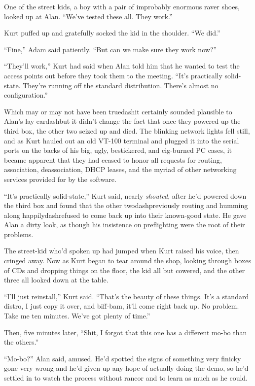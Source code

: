 One of the street kids, a boy with a pair of improbably enormous raver
shoes, looked up at Alan.  ``We've tested these all.  They work.''

Kurt puffed up and gratefully socked the kid in the shoulder.  ``We
did.''

``Fine,'' Adam said patiently.  ``But can we make sure they work
now?''

``They'll work,'' Kurt had said when Alan told him that he wanted to
test the access points out before they took them to the meeting. 
``It's practically solid-state.  They're running off the standard
distribution.  There's almost no configuration.''

Which may or may not have been truedash{}it certainly sounded plausible
to Alan's lay eardash{}but it didn't change the fact that once they
powered up the third box, the other two seized up and died.  The
blinking network lights fell still, and as Kurt hauled out an old
VT-100 terminal and plugged it into the serial ports on the backs of
his big, ugly, bestickered, and cig-burned PC cases, it became
apparent that they had ceased to honor all requests for routing,
association, deassociation, DHCP leases, and the myriad of other
networking services provided for by the software.

``It's practically solid-state,'' Kurt said, nearly \textit{shouted},
after he'd powered down the third box and found that the other
twodash{}previously routing and humming along happilydash{}refused to come
back up into their known-good state.  He gave Alan a dirty look, as
though his insistence on preflighting were the root of their problems.

The street-kid who'd spoken up had jumped when Kurt raised his voice,
then cringed away.  Now as Kurt began to tear around the shop, looking
through boxes of CDs and dropping things on the floor, the kid all but
cowered, and the other three all looked down at the table.

``I'll just reinstall,'' Kurt said.  ``That's the beauty of these
things.  It's a standard distro, I just copy it over, and biff-bam,
it'll come right back up.  No problem.  Take me ten minutes.  We've
got plenty of time.''

Then, five minutes later, ``Shit, I forgot that this one has a
different mo-bo than the others.''

``Mo-bo?'' Alan said, amused.  He'd spotted the signs of something
very finicky gone very wrong and he'd given up any hope of actually
doing the demo, so he'd settled in to watch the process without rancor
and to learn as much as he could.

